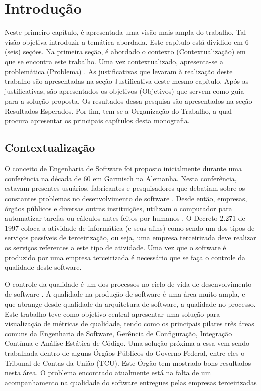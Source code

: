 \chapter[Introdução]{Introdução}
	Neste primeiro capítulo, é apresentada uma visão mais ampla do trabalho. Tal visão objetiva introduzir a temática abordada. Este capítulo está dividido em 6 (seis) seções. Na primeira seção, é abordado o contexto (Contextualização) em que se encontra este trabalho. Uma vez contextualizado, apresenta-se a problemática (Problema) . As justificativas que levaram à realização deste trabalho são apresentadas na seção Justificativa deste mesmo capítulo. Após as justificativas, são apresentados os objetivos (Objetivos) que servem como guia para a solução proposta. Os resultados dessa pesquisa  são apresentados na seção Resultados Esperados. Por fim, tem-se a Organização do Trabalho, a qual procura apresentar os principais capítulos desta monografia.


\section{Contextualização}
	O conceito de Engenharia de Software foi proposto inicialmente durante uma conferência na década de 60 em Garmisch na Alemanha. Nesta conferência, estavam presentes usuários, fabricantes e pesquisadores que debatiam sobre os constantes problemas no desenvolvimento de software \cite{Paduelli}. Desde então, empresas, órgãos públicos e diversas outras instituições, utilizam o computador para automatizar tarefas ou cálculos antes feitos por humanos \cite{fonseca2007historia}. O Decreto 2.271 de 1997 \cite{decreto_2271} coloca a atividade de informática (e seus afins) como sendo um dos tipos de serviços passíveis de terceirização, ou seja, uma empresa terceirizada deve realizar os serviços referentes a este tipo de atividade. Uma vez que o software é produzido por uma empresa terceirizada é necessário que se faça o controle da qualidade deste software.

O controle da qualidade é um dos processos no ciclo de vida de desenvolvimento de software \cite{machado_metricas_2004}. A qualidade na produção de software é uma área muito ampla, e que abrange desde qualidade da arquitetura de software, a qualidade no processo. Este trabalho teve como objetivo central apresentar uma solução para visualização de métricas de qualidade, tendo como os principais pilares três áreas comuns da Engenharia de Software, Gerência de Configuração, Integração Contínua e Análise Estática de Código. Uma solução próxima a essa vem sendo trabalhada dentro de alguns Órgãos Públicos do Governo Federal, entre eles o Tribunal de Contas da União (TCU). Este Órgão tem mostrado bons resultados nesta área. O problema encontrado atualmente está na falta de um acompanhamento na qualidade do software entregues pelas empresas terceirizadas 	

